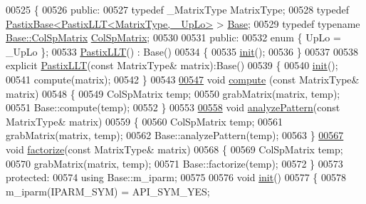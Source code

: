 \begin{DoxyCode}
00525 \{
00526   \textcolor{keyword}{public}:
00527     \textcolor{keyword}{typedef} \_MatrixType MatrixType;
00528     \textcolor{keyword}{typedef} \hyperlink{class_eigen_1_1_pastix_base}{PastixBase<PastixLLT<MatrixType, \_UpLo>} > 
      \hyperlink{class_eigen_1_1_pastix_base}{Base};
00529     \textcolor{keyword}{typedef} \textcolor{keyword}{typename} \hyperlink{group___sparse_core___module}{Base::ColSpMatrix} \hyperlink{group___sparse_core___module}{ColSpMatrix};
00530     
00531   \textcolor{keyword}{public}:
00532     \textcolor{keyword}{enum} \{ UpLo = \_UpLo \};
00533     \hyperlink{class_eigen_1_1_pastix_l_l_t}{PastixLLT}() : Base()
00534     \{
00535       \hyperlink{structinit}{init}();
00536     \}
00537     
00538     \textcolor{keyword}{explicit} \hyperlink{class_eigen_1_1_pastix_l_l_t}{PastixLLT}(\textcolor{keyword}{const} MatrixType& matrix):Base()
00539     \{
00540       \hyperlink{structinit}{init}();
00541       compute(matrix);
00542     \}
00543 
\hyperlink{class_eigen_1_1_pastix_l_l_t_a54fcdef53903851e2d8113a6ed330b5c}{00547}     \textcolor{keywordtype}{void} \hyperlink{class_eigen_1_1_pastix_l_l_t_a54fcdef53903851e2d8113a6ed330b5c}{compute} (\textcolor{keyword}{const} MatrixType& matrix)
00548     \{
00549       ColSpMatrix temp;
00550       grabMatrix(matrix, temp);
00551       Base::compute(temp);
00552     \}
00553 
\hyperlink{class_eigen_1_1_pastix_l_l_t_a671e8444ae2f04db3565e35caa958667}{00558}     \textcolor{keywordtype}{void} \hyperlink{class_eigen_1_1_pastix_l_l_t_a671e8444ae2f04db3565e35caa958667}{analyzePattern}(\textcolor{keyword}{const} MatrixType& matrix)
00559     \{
00560       ColSpMatrix temp;
00561       grabMatrix(matrix, temp);
00562       Base::analyzePattern(temp);
00563     \}
\hyperlink{class_eigen_1_1_pastix_l_l_t_a63dac317804b18a4704a519d7bdfaaff}{00567}     \textcolor{keywordtype}{void} \hyperlink{class_eigen_1_1_pastix_l_l_t_a63dac317804b18a4704a519d7bdfaaff}{factorize}(\textcolor{keyword}{const} MatrixType& matrix)
00568     \{
00569       ColSpMatrix temp;
00570       grabMatrix(matrix, temp);
00571       Base::factorize(temp);
00572     \}
00573   \textcolor{keyword}{protected}:
00574     \textcolor{keyword}{using} Base::m\_iparm;
00575     
00576     \textcolor{keywordtype}{void} \hyperlink{structinit}{init}()
00577     \{
00578       m\_iparm(IPARM\_SYM) = API\_SYM\_YES;

\end{DoxyCode}
